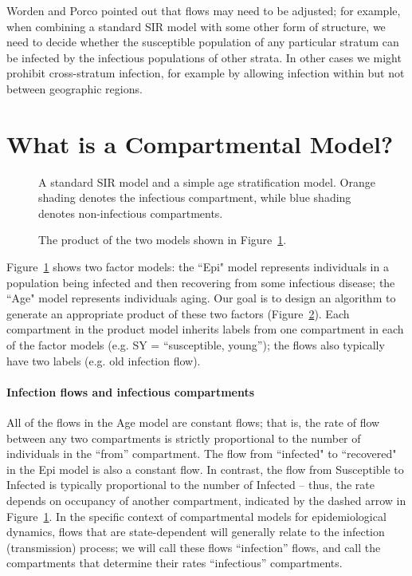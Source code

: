 Worden and Porco pointed out that flows may need to be adjusted; for example, when combining a standard SIR model with some other form of structure, we need to decide whether the susceptible population of any particular stratum can be infected by the infectious populations of other strata.
In other cases we might prohibit cross-stratum infection, for example by allowing infection within but not between geographic regions. 

\section{What is a Compartmental Model?}\label{dcm}

\begin{figure}
    \centering
    
    \caption{A standard SIR model and a simple age stratification model. Orange shading denotes the infectious compartment, while blue shading denotes non-infectious compartments.}
    \label{fig:sir_age_strat}
\end{figure}

\begin{figure}
    \centering
    
    \caption{The product of the two models shown in Figure~\ref{fig:sir_age_strat}. }
    \label{fig:simple_sir_age}
\end{figure}

Figure~\ref{fig:sir_age_strat} shows two factor models: the ``Epi" model represents individuals in a population being infected and then recovering from some infectious disease; the ``Age" model represents individuals aging. Our goal is to design an algorithm to generate an appropriate product of these two factors (Figure~\ref{fig:simple_sir_age}). Each compartment in the product model inherits labels from one compartment in each of the factor models (e.g. SY = ``susceptible, young''); the flows also typically have two labels (e.g. old infection flow). 

\paragraph{Infection flows and infectious compartments}

All of the flows in the Age model are constant \pc flows; that is, the rate of flow between any two compartments is strictly proportional to the number of individuals in the ``from'' compartment. 
The flow from ``infected" to ``recovered" in the Epi model is also a constant \pc flow. In contrast, the \pc flow from Susceptible to Infected is typically proportional to the number of Infected -- thus, the \pc rate depends on occupancy of another compartment, indicated by the dashed arrow in Figure~\ref{fig:sir_age_strat}. In the specific context of compartmental models for epidemiological dynamics, \pc flows that are state-dependent will generally relate to the infection (transmission) process; we will call these flows ``infection'' flows, and call the compartments that determine their rates ``infectious'' compartments.

